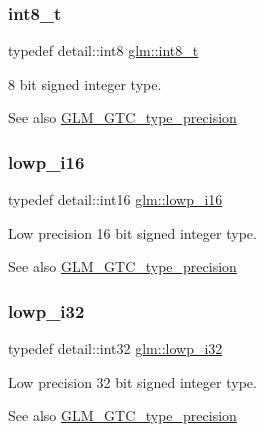 \subsubsection{\texorpdfstring{int8\+\_\+t}{int8\_t}}
{\footnotesize\ttfamily typedef detail\+::int8 \hyperlink{group__gtc__type__precision_ga673898d450b2a91186f3c4f40c5f8633}{glm\+::int8\+\_\+t}}

8 bit signed integer type. \begin{DoxySeeAlso}{See also}
\hyperlink{group__gtc__type__precision}{G\+L\+M\+\_\+\+G\+T\+C\+\_\+type\+\_\+precision} 
\end{DoxySeeAlso}
\mbox{\label{group__gtc__type__precision_gaf7bbfd31bcec25a416ea94d09efb5451}} 
\subsubsection{\texorpdfstring{lowp\+\_\+i16}{lowp\_i16}}
{\footnotesize\ttfamily typedef detail\+::int16 \hyperlink{group__gtc__type__precision_gaf7bbfd31bcec25a416ea94d09efb5451}{glm\+::lowp\+\_\+i16}}

Low precision 16 bit signed integer type. \begin{DoxySeeAlso}{See also}
\hyperlink{group__gtc__type__precision}{G\+L\+M\+\_\+\+G\+T\+C\+\_\+type\+\_\+precision} 
\end{DoxySeeAlso}
\mbox{\label{group__gtc__type__precision_ga70fd34e8b8cffc92739161284ed77328}} 
\subsubsection{\texorpdfstring{lowp\+\_\+i32}{lowp\_i32}}
{\footnotesize\ttfamily typedef detail\+::int32 \hyperlink{group__gtc__type__precision_ga70fd34e8b8cffc92739161284ed77328}{glm\+::lowp\+\_\+i32}}

Low precision 32 bit signed integer type. \begin{DoxySeeAlso}{See also}
\hyperlink{group__gtc__type__precision}{G\+L\+M\+\_\+\+G\+T\+C\+\_\+type\+\_\+precision} 
\end{DoxySeeAlso}
\mbox{\label{group__gtc__type__precision_ga1f4ded25f71c0f3b4518936d50b54b6e}} 
